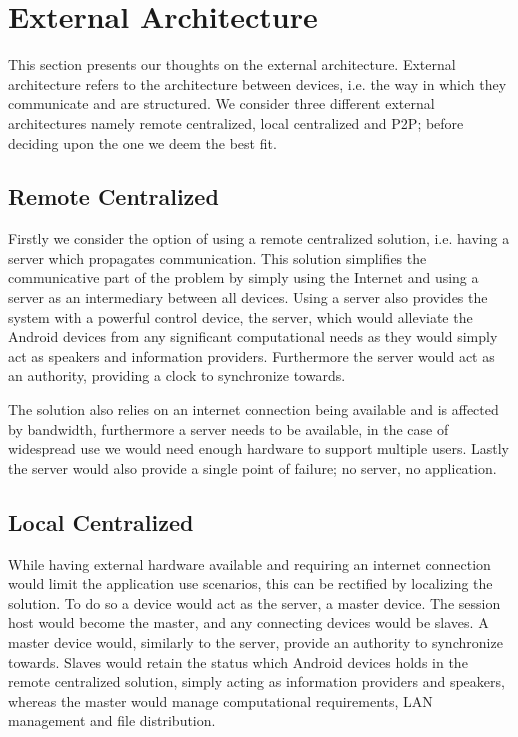 \section{External Architecture}
This section presents our thoughts on the external architecture.
External architecture refers to the architecture between devices, i.e. the way in which they communicate and are structured.
We consider three different external architectures namely remote centralized, local centralized and \ac{P2P}; before deciding upon the one we deem the best fit.

\subsection{Remote Centralized}
Firstly we consider the option of using a remote centralized solution, i.e. having a server which propagates communication.
This solution simplifies the communicative part of the problem by simply using the Internet and using a server as an intermediary between all devices.
Using a server also provides the system with a powerful control device, the server, which would alleviate the Android devices from any significant computational needs as they would simply act as speakers and information providers.
Furthermore the server would act as an authority, providing a clock to synchronize towards.

The solution also relies on an internet connection being available and is affected by bandwidth, furthermore a server needs to be available, in the case of widespread use we would need enough hardware to support multiple users. 
Lastly the server would also provide a single point of failure; no server, no application.

\subsection{Local Centralized}
While having external hardware available and requiring an internet connection would limit the application use scenarios, this can be rectified by localizing the solution.
To do so a device would act as the server, a master device.
The session host would become the master, and any connecting devices would be slaves.
A master device would, similarly to the server, provide an authority to synchronize towards.
Slaves would retain the status which Android devices holds in the remote centralized solution, simply acting as information providers and speakers, whereas the master would manage computational requirements, LAN management and file distribution.

